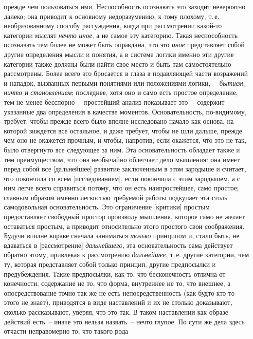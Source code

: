 прежде чем пользоваться ими. Неспособность
осознавать это заходит невероятно далеко; она приводит
к основному недоразумению, к тому плохому, т.\,е. необразованному
способу рассуждения, когда при рассмотрении
какой-то категории мыслят \emph{нечто иное}, а не самое
эту категорию. Такая неспособность осознавать тем более
не может быть оправдана, что это \emph{иное} представляет собой
другие определения мысли и понятия, а в системе
логики именно эти другие категории также должны были
найти свое место и быть там самостоятельно рассмотрены.
Более всего это бросается в глаза в подавляющей части
возражений и нападок, вызванных первыми понятиями
или положениями логики,~-- \emph{бытием}, \emph{ничто} и \emph{становлением};
последнее, хотя оно и само есть простое определение,
тем не менее бесспорно~-- простейший анализ показывает
это~-- содержит указанные два определения в качестве
моментов. Основательность, по-видимому, требует,
чтобы прежде всего было вполне исследовано начало как
основа, на которой зиждется все остальное, и даже требует,
чтобы не шли дальше, прежде чем оно не окажется
прочным, и чтобы, напротив, если окажется, что это не
так, было отвергнуто все следующее за ним. Эта основательность
обладает также и тем преимуществом, что она
необычайно облегчает дело мышления: она имеет перед
собой все [дальнейшее] развитие заключенным в этом зародыше
и считает, что покончила со всем [исследованием],
если покончила с этим зародышем, а с ним легче всего
справиться потому, что он есть наипростейшее, само простое;
главным образом именно легкостью требуемой работы
подкупает эта столь самодовольная основательность.
Это ограничение [критики] простым предоставляет свободный
простор произволу мышления, которое само не
желает оставаться простым, а приводит относительно
этого простого свои соображения. Будучи вполне вправе
сначала заниматься \emph{только} принципом и, стало быть, не
вдаваться в [рассмотрение] \emph{дальнейшего}, эта основательность
сама действует обратно этому, привлекая к рассмотрению
\emph{дальнейшее}, т.\,е. другие категории, чем ту, которая
представляет собой только принцип, другие предпосылки
и предубеждения. Такие предпосылки, как то, что бесконечность
отлична от конечности, содержание не то, что
форма, внутреннее не то, что внешнее, а опосредствование
точно так же не есть непосредственность (как будто
кто-то этого не знает), приводятся в виде наставлений и
их не столько доказывают, сколько рассказывают, уверяя,
что это так. В таком наставлении как образе действий
есть~-- иначе это нельзя назвать~-- нечто глупое. По сути
же дела здесь отчасти неправомерно то, что такого рода
